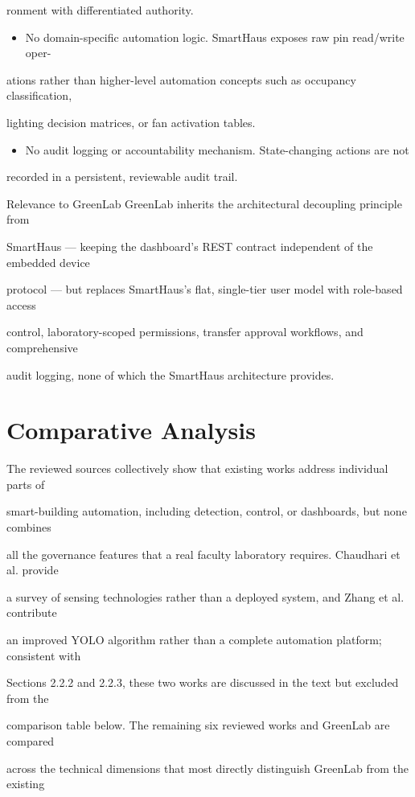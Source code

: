 ronment with differentiated authority.

\begin{itemize}
	\item No domain-speciﬁc automation logic. SmartHaus exposes raw pin read/write oper-
\end{itemize}
ations rather than higher-level automation concepts such as occupancy classiﬁcation,

lighting decision matrices, or fan activation tables.

\begin{itemize}
	\item No audit logging or accountability mechanism. State-changing actions are not
\end{itemize}
recorded in a persistent, reviewable audit trail.

Relevance to GreenLab GreenLab inherits the architectural decoupling principle from

SmartHaus --- keeping the dashboard's REST contract independent of the embedded device

protocol --- but replaces SmartHaus's ﬂat, single-tier user model with role-based access

control, laboratory-scoped permissions, transfer approval workﬂows, and comprehensive

audit logging, none of which the SmartHaus architecture provides.


\section{Comparative Analysis}
The reviewed sources collectively show that existing works address individual parts of

smart-building automation, including detection, control, or dashboards, but none combines

all the governance features that a real faculty laboratory requires. Chaudhari et al. provide

a survey of sensing technologies rather than a deployed system, and Zhang et al. contribute

an improved YOLO algorithm rather than a complete automation platform; consistent with

Sections 2.2.2 and 2.2.3, these two works are discussed in the text but excluded from the

comparison table below. The remaining six reviewed works and GreenLab are compared

across the technical dimensions that most directly distinguish GreenLab from the existing

